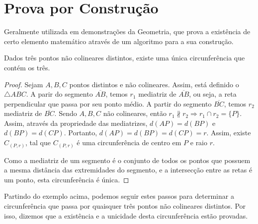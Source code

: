 \section{Prova por Construção}
Geralmente utilizada em demonstrações da Geometria, que prova a existência de certo elemento matemático através de um algoritmo para a sua construção.
\begin{comment}
\begin{exemplo}
Dado um segmento $\overline{AB}$, existe um triângulo equilátero de base $\overline{AB}$.
\begin{proof}
Sejam dois pontos $A, B$, tais que $A \neq B$. Assim, existe a circunferência $\gamma$ com centro em A que passa pelo ponto B. Existe, também, a circunferência $\lambda$ com centro em B que passa pelo ponto A.\par  Como $d(A,B) = \overline{AB} < r(\lambda) + r(\gamma) = 2 \overline{AB}$. Assim, as circunferências são  secantes e portanto $\lambda \cap \gamma = \{C, D\}$. \par Assim, está definido $\triangle ABD$. Como $\overline{AD}$, $\overline{BD}$ e $\overline{AB}$ são raios de uma mesma circunferência, $\triangle ABD$ é um triângulo equilátero.
\end{proof}
\end{exemplo}
\end{comment}

\begin{exemplo}
Dados três pontos não colineares distintos, existe uma única circunferência que contém os três.
\begin{proof}
Sejam $A,B,C$ pontos distintos e não colineares. Assim, está definido o $\triangle ABC$. A parir do segmento $\overline{AB}$, temos $r_1$ mediatriz de $\overline{AB}$, ou seja, a reta perpendicular que passa por seu ponto médio. A partir do segmento $\overline{BC}$, temos $r_2$ mediatriz de $\overline{BC}$. Sendo $A,B,C$ não colineares, então $r_1 \not\parallel r_2 \Rightarrow r_1 \cap r_2 = \{P\}$. Assim, através da propriedade das mediatrizes, $d(AP)=d(BP)$ e $d(BP)=d(CP)$. Portanto, $d(AP)=d(BP)=d(CP)=r$. Assim, existe $C_{(P,r)}$, tal que $C_{(P,r)}$ é uma circunferência de centro em $P$ e raio $r$. \par 
Como a mediatriz de um segmento é o conjunto de todos os pontos que possuem a mesma distância das extremidades do segmento, e a intersecção entre as retas é um ponto, esta circunferência é única.
\end{proof}
\end{exemplo}
Partindo do exemplo acima, podemos seguir estes passos para determinar a circunferência que passa por quaisquer três pontos não colineares distintos. Por isso, dizemos que a existência e a unicidade desta circunferência estão provadas.
